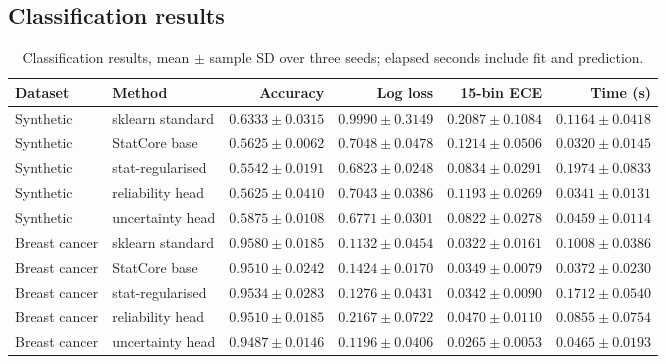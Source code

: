 \documentclass[conference]{IEEEtran}
\begin{document}
\subsection{Classification results}
\begin{table}[t]
\centering
\small\setlength{\tabcolsep}{3pt}
\caption{Classification results, mean $\pm$ sample SD over three seeds; elapsed seconds include fit and prediction.}
\label{tab:class-results}
\begin{tabular}{llrrrr}
\toprule
Dataset & Method & Accuracy & Log loss & 15-bin ECE & Time (s)\\
\midrule
Synthetic & sklearn standard & $0.6333\pm0.0315$ & $0.9990\pm0.3149$ & $0.2087\pm0.1084$ & $0.1164\pm0.0418$\\
Synthetic & StatCore base & $0.5625\pm0.0062$ & $0.7048\pm0.0478$ & $0.1214\pm0.0506$ & $0.0320\pm0.0145$\\
Synthetic & stat-regularised & $0.5542\pm0.0191$ & $0.6823\pm0.0248$ & $0.0834\pm0.0291$ & $0.1974\pm0.0833$\\
Synthetic & reliability head & $0.5625\pm0.0410$ & $0.7043\pm0.0386$ & $0.1193\pm0.0269$ & $0.0341\pm0.0131$\\
Synthetic & uncertainty head & $0.5875\pm0.0108$ & $0.6771\pm0.0301$ & $0.0822\pm0.0278$ & $0.0459\pm0.0114$\\
Breast cancer & sklearn standard & $0.9580\pm0.0185$ & $0.1132\pm0.0454$ & $0.0322\pm0.0161$ & $0.1008\pm0.0386$\\
Breast cancer & StatCore base & $0.9510\pm0.0242$ & $0.1424\pm0.0170$ & $0.0349\pm0.0079$ & $0.0372\pm0.0230$\\
Breast cancer & stat-regularised & $0.9534\pm0.0283$ & $0.1276\pm0.0431$ & $0.0342\pm0.0090$ & $0.1712\pm0.0540$\\
Breast cancer & reliability head & $0.9510\pm0.0185$ & $0.2167\pm0.0722$ & $0.0470\pm0.0110$ & $0.0855\pm0.0754$\\
Breast cancer & uncertainty head & $0.9487\pm0.0146$ & $0.1196\pm0.0406$ & $0.0265\pm0.0053$ & $0.0465\pm0.0193$\\
\bottomrule
\end{tabular}
\end{table}
\end{document}
